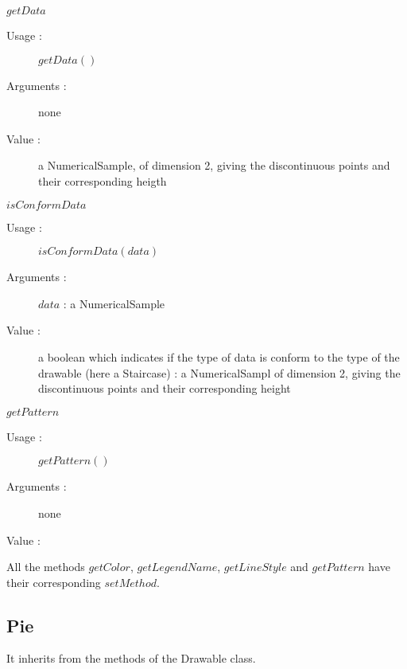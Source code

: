 \begin{description}
\begin{description}
  \item $getData$
    \begin{description}
    \item[Usage :] $getData()$
    \item[Arguments :] none
    \item[Value :] a NumericalSample, of dimension 2, giving the discontinuous points and their corresponding heigth
    \end{description}
    \bigskip
  \item $isConformData$
    \begin{description}
    \item[Usage :] $isConformData(data)$
    \item[Arguments :] $data$ : a NumericalSample
    \item[Value :] a boolean which indicates if the type of data is conform to the type of the drawable (here a Staircase) : a NumericalSampl of dimension 2, giving the discontinuous points and their corresponding height
    \end{description}
    \bigskip
  \item $getPattern$
    \begin{description}
    \item[Usage :] $getPattern()$
    \item[Arguments :] none
    \item[Value :]
    \end{description}
  \end{description}

  All the methods $getColor$,  $getLegendName$,  $getLineStyle$  and $getPattern$ have their corresponding $setMethod$.

\end{description}




\newpage \subsection{Pie}

It inherits from the methods of the Drawable class.

